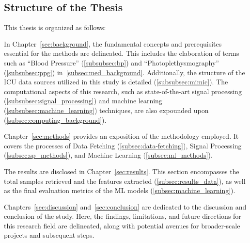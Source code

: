 \subsection{Structure of the Thesis}
\label{subsec:structure}

This thesis is organized as follows:

In Chapter~\ref{sec:background}, the fundamental concepts and prerequisites essential for the methods are delineated.
This includes the elaboration of terms such as \enquote{Blood Pressure} (\ref{subsubsec:bp}) and \enquote{Photoplethysmography} (\ref{subsubsec:ppg}) in~\ref{subsec:med_background}.
Additionally, the structure of the ICU data sources utilized in this study is detailed (\ref{subsubsec:mimic}).
The computational aspects of this research, such as state-of-the-art signal processing (\ref{subsubsec:signal_processing}) and machine learning (\ref{subsubsec:machine_learning}) techniques, are also expounded upon (\ref{subsec:computing_background}).

Chapter~\ref{sec:methods} provides an exposition of the methodology employed.
It covers the processes of Data Fetching (\ref{subsec:data-fetching}), Signal Processing (\ref{subsec:sp_methods}), and Machine Learning (\ref{subsec:ml_methods}).

The results are disclosed in Chapter~\ref{sec:results}.
This section encompasses the total samples retrieved and the features extracted (\ref{subsec:results_data}), as well as the final evaluation metrics of the ML models (\ref{subsec:machine_learning}).

Chapters~\ref{sec:discussion} and~\ref{sec:conclusion} are dedicated to the discussion and conclusion of the study.
Here, the findings, limitations, and future directions for this research field are delineated, along with potential avenues for broader-scale projects and subsequent steps.